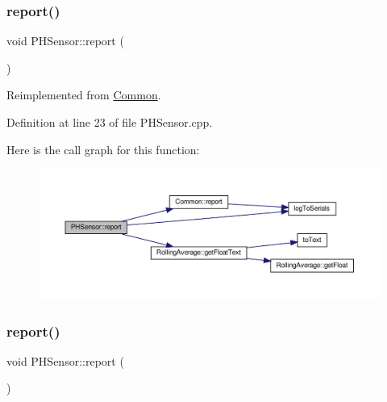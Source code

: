 \subsubsection{\texorpdfstring{report()}{report()}\hspace{0.1cm}{\footnotesize\ttfamily [1/2]}}
{\footnotesize\ttfamily void P\+H\+Sensor\+::report (\begin{DoxyParamCaption}{ }\end{DoxyParamCaption})\hspace{0.3cm}{\ttfamily [virtual]}}



Reimplemented from \hyperlink{class_common_a9e60e2c26a5f4d72342a59a969954636}{Common}.



Definition at line 23 of file P\+H\+Sensor.\+cpp.

Here is the call graph for this function\+:
\nopagebreak
\begin{figure}[H]
\begin{center}
\leavevmode
\includegraphics[width=350pt]{class_p_h_sensor_af9730aece2d3bcb71ac9d4f1e6f96f1e_cgraph}
\end{center}
\end{figure}
\mbox{\label{class_p_h_sensor_af9730aece2d3bcb71ac9d4f1e6f96f1e}} 
\subsubsection{\texorpdfstring{report()}{report()}\hspace{0.1cm}{\footnotesize\ttfamily [2/2]}}
{\footnotesize\ttfamily void P\+H\+Sensor\+::report (\begin{DoxyParamCaption}{ }\end{DoxyParamCaption})\hspace{0.3cm}{\ttfamily [virtual]}}



